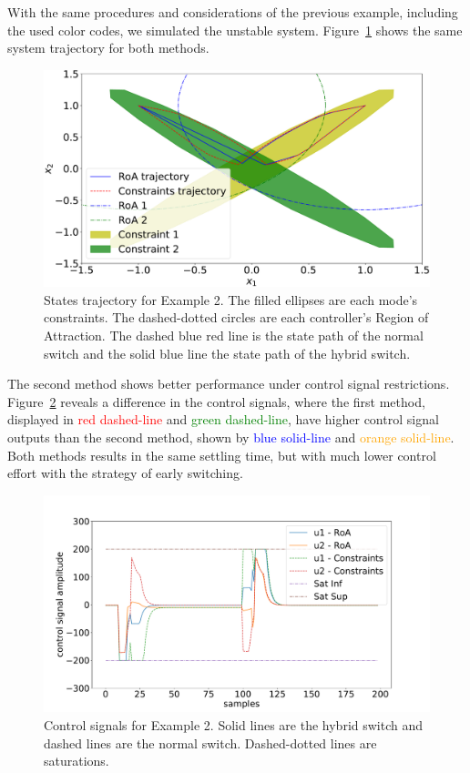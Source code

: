 With the same procedures and considerations of the previous example, including
the used color codes, we simulated the unstable system.
Figure~\ref{fig:unstable-states} shows the same system trajectory for both
methods.

\begin{figure}[ht!]
  \centering
  \includegraphics[width=\linewidth]{imgs/unstable_states}
  \caption[States trajectory for Example 2.]{States trajectory for Example 2.
    The filled ellipses are each mode's constraints. The dashed-dotted circles
    are each controller's Region of Attraction. The dashed blue red line is the
    state path of the normal switch and the solid blue line the state path of
    the hybrid switch.}%
  \label{fig:unstable-states}
\end{figure}

The second method shows better performance under control signal restrictions.
Figure~\ref{fig:unstable-control-signals} reveals a difference in the control
signals, where the first method, displayed in \textcolor{red}{red dashed-line}
and \textcolor{green}{green dashed-line}, have higher control signal outputs
than the second method, shown by \textcolor{blue}{blue solid-line} and
\textcolor{orange}{orange solid-line}. Both methods results in the same settling
time, but with much lower control effort with the strategy of early switching.

\begin{figure}[ht!]
  \centering
  \includegraphics[width=\linewidth]{imgs/unstable_control_signal}
  \caption[Control signals for Example 2.]{Control signals for Example 2. Solid
    lines are the hybrid switch and dashed lines are the normal switch.
    Dashed-dotted lines are saturations.}%
  \label{fig:unstable-control-signals}
\end{figure}

